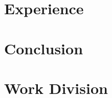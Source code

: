 \documentclass[10pt,twocolumn,letterpaper]{article}
\begin{document}
\section{Experience}
\section{Conclusion}
\section{Work Division}







\end{document}
